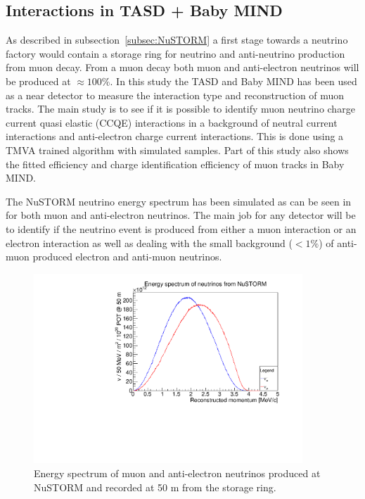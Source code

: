 

\pagebreak
\subsection{Interactions in TASD + Baby MIND}

As described in subsection~\ref{subsec:NuSTORM} a first stage towards a neutrino factory would contain a storage ring for neutrino and anti-neutrino production from muon decay. From a muon decay both muon and anti-electron neutrinos will be produced at $\approx 100\%$. In this study the TASD and Baby MIND has been used as a near detector to measure the interaction type and reconstruction of muon tracks. The main study is to see if it is possible to identify muon neutrino charge current quasi elastic (CCQE) interactions in a background of neutral current interactions and anti-electron charge current interactions. This is done using a TMVA trained algorithm with simulated samples. Part of this study also shows the fitted efficiency and charge identification efficiency of muon tracks in Baby MIND.

The NuSTORM neutrino energy spectrum has been simulated as can be seen in  for both muon and anti-electron neutrinos. The main job for any detector will be to identify if the neutrino event is produced from either a muon interaction or an electron interaction as well as dealing with the small background ($<1\%$) of anti-muon produced electron and anti-muon neutrinos.

\begin{figure}[h!]
\centering
\includegraphics[width=0.9\textwidth]{figures/eSpectrum.pdf}
\caption{Energy spectrum of muon and anti-electron neutrinos produced at NuSTORM and recorded at 50 m from the storage ring.}
\label{fig:NuSTORMeSpectrum}
\end{figure}


